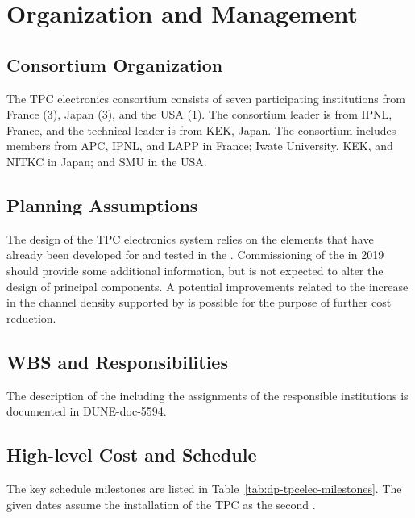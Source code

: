 \section{Organization and Management}
\label{sec:dp-tpcelec-org}

\subsection{Consortium Organization}
\label{ssec:dp-tpcelec-org-consortium}
The \dual TPC electronics consortium %
consists of seven participating institutions from France (\num{3}), Japan (\num{3}), and the USA (\num{1}). The consortium leader is from IPNL, France, and the technical leader is from KEK, Japan. The consortium includes members from APC, IPNL, and LAPP in France; Iwate University, KEK, and NITKC in Japan; and SMU in the USA.

\subsection{Planning Assumptions}
\label{ssec:dp-tpcelec-org-assmp}
The design of the \dual TPC electronics system relies on the elements that have already been developed for  and tested in the .  Commissioning of the  in 2019 should provide some additional information, but is not expected to alter the design of principal components. A potential improvements related to the increase in the channel density supported by   is possible for the purpose of further cost reduction. 

\subsection{WBS and Responsibilities}
\label{ssec:dp-tpcelec-org-wbs}
The description of the  including the assignments of the responsible institutions is documented in DUNE-doc-5594. 

\subsection{High-level Cost and Schedule}
\label{ssec:dp-tpcelec-org-cs}
The key schedule milestones are listed in Table~\ref{tab:dp-tpcelec-milestones}. The given dates assume the installation of the \dual TPC as the second  .

